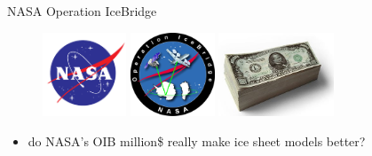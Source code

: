 \documentclass[hide notes,intlimits,unknownkeysallowed]{beamer}
\begin{document}
\begin{frame}{NASA Operation IceBridge}
  \begin{figure}
    \includegraphics[height=2.5cm]{nasa-logo} \qquad
    \includegraphics[height=2.5cm]{oib} \qquad
    \includegraphics[height=2.5cm]{1000-dollar-bills}
  \end{figure}
  \begin{itemize}
  \item do NASA's OIB million\$ really make ice sheet models better?
  \end{itemize}
\end{frame}
\end{document}
